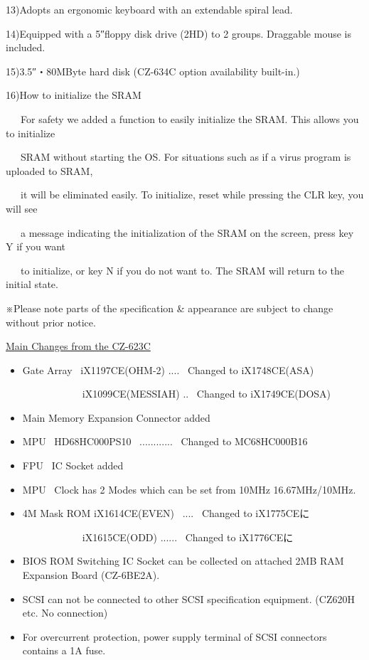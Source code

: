 \documentclass[twoside,a4paper,12pt]{article}
\begin{document}
13)Adopts an ergonomic keyboard with an extendable spiral lead.

14)Equipped with a 5″floppy disk drive (2HD) to 2 groups. Draggable mouse is included.

15)3.5″・80MByte hard disk (CZ-634C option availability built-in.)

16)How to initialize the SRAM

\ \ \ For safety we added a function to easily initialize the SRAM. This allows you to initialize

\ \ \ SRAM without starting the OS. For situations such as if a virus program is uploaded to SRAM,

\ \ \ it will be eliminated easily. To initialize, reset while pressing the CLR key, you will see

\ \ \ a message indicating the initialization of the SRAM on the screen, press key Y if you want

\ \ \ to initialize, or key N if you do not want to. The SRAM will return to the initial state.

※Please note parts of the specification \& appearance are subject to change without prior notice.

\newpage

\normalsize\uline{Main Changes from the CZ-623C}

\renewcommand{\labelitemi}{\scriptsize●}
\small
\begin{itemize}[leftmargin=25mm, itemsep=-1mm, topsep=1mm]
\item
Gate Array \ iX1197CE(OHM-2) .... \ Changed to iX1748CE(ASA)

\ \ \ \ \ \ \ \ \ \ \ \ iX1099CE(MESSIAH) .. \ Changed to iX1749CE(DOSA)
\item
Main Memory Expansion Connector added
\item
MPU \ HD68HC000PS10 \ ............ \ Changed to MC68HC000B16
\item
FPU \ IC Socket added
\item
MPU \ Clock has 2 Modes which can be set from 10MHz 16.67MHz/10MHz.
\item
4M Mask ROM iX1614CE(EVEN) \ .... \ Changed to iX1775CEに

\ \ \ \ \ \ \ \ \ \ \ \ iX1615CE(ODD) ...... \ Changed to iX1776CEに
\item
BIOS ROM Switching IC Socket can be collected on attached 2MB RAM Expansion Board (CZ-6BE2A).
\item
SCSI can not be connected to other SCSI specification equipment. (CZ620H etc. No connection)
\item
For overcurrent protection, power supply terminal of SCSI connectors contains a 1A fuse.
\end{itemize}
\end{document}
